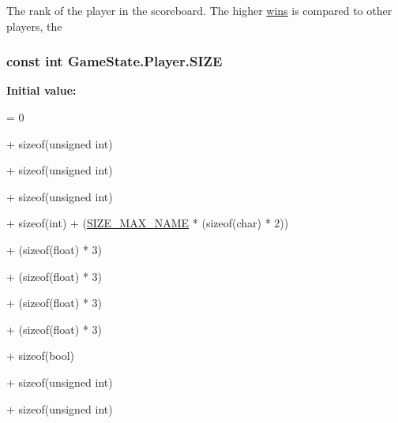 The rank of the player in the scoreboard. The higher \hyperlink{class_game_state_1_1_player_a3a4d13459cad9bd58e058ddc6387af70}{wins} is compared to other players, the 

\hypertarget{class_game_state_1_1_player_a07b452f69128e1f3f6d3bb575c2976f1}{
\subsubsection[{S\-I\-Z\-E}]{\setlength{\rightskip}{0pt plus 5cm}const int Game\-State.\-Player.\-S\-I\-Z\-E\hspace{0.3cm}{\ttfamily [static]}}}\label{class_game_state_1_1_player_a07b452f69128e1f3f6d3bb575c2976f1}
{\bfseries Initial value\-:}
\begin{DoxyCode}
= 0
            
            + \textcolor{keyword}{sizeof}(\textcolor{keywordtype}{unsigned} int)
            
            + \textcolor{keyword}{sizeof}(\textcolor{keywordtype}{unsigned} \textcolor{keywordtype}{int})
            
            + \textcolor{keyword}{sizeof}(\textcolor{keywordtype}{unsigned} int)
            
            + \textcolor{keyword}{sizeof}(\textcolor{keywordtype}{int}) + (\hyperlink{class_game_state_1_1_player_a1cdc9de8183b220e87632f7f6a7147d0}{SIZE\_MAX\_NAME} * (\textcolor{keyword}{sizeof}(char) * 2))
            
            + (\textcolor{keyword}{sizeof}(\textcolor{keywordtype}{float}) * 3)
            
            + (\textcolor{keyword}{sizeof}(\textcolor{keywordtype}{float}) * 3)
            
            + (\textcolor{keyword}{sizeof}(\textcolor{keywordtype}{float}) * 3)
            
            + (\textcolor{keyword}{sizeof}(\textcolor{keywordtype}{float}) * 3)
            
            + \textcolor{keyword}{sizeof}(\textcolor{keywordtype}{bool})
            
            + \textcolor{keyword}{sizeof}(\textcolor{keywordtype}{unsigned} int)
            
            + \textcolor{keyword}{sizeof}(\textcolor{keywordtype}{unsigned} \textcolor{keywordtype}{int})
\end{DoxyCode}


